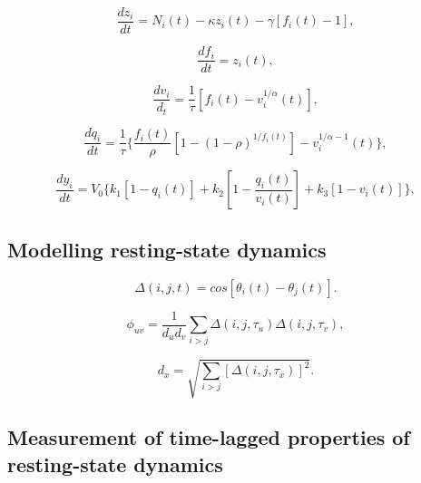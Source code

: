 \documentclass[sn-mathphys-num]{sn-jnl}%
\theoremstyle{thmstyleone}%
\theoremstyle{thmstyletwo}%
\theoremstyle{thmstylethree}%
\begin{document}
\begin{equation}\label{eq:vasodilatory_signal}
	\frac{dz_i}{dt} = N_i (t) - 
	\kappa z_i(t) - 
	\gamma [f_i(t) - 1], 
\end{equation}


\begin{equation}\label{eq:blood_inflow}
	\frac{df_i}{dt} = z_i(t),
\end{equation}


\begin{equation}\label{eq:blood_volume}
	\frac{dv_i}{d_t} = \frac{1}{\tau} [f_i(t) - v_i^{1/\alpha} (t)],
\end{equation}


\begin{equation}\label{eq:deoxyhaemoglobin}
	\frac{dq_i}{dt} = \frac{1}{\tau}
	\{
	\frac{f_i(t)}{\rho}
	[1 - (1-\rho)^{1/f_i(t)}]
	- v_i^{1/\alpha - 1} (t)
	\},
\end{equation}


\begin{equation}\label{eq:BOLD_signal}
	\frac{dy_i}{dt} = V_0
	\{
	k_1 [1 - q_i(t)] +
	k_2 [1 - \frac{q_i(t)}{v_i(t)}] + 
	k_3 [1 - v_i(t)]
	\},
\end{equation}


\subsection{Modelling resting-state dynamics} \label{sec:modelling_resting}


\begin{equation}\label{eq:synchrony}
	\Delta(i,j,t) = cos [\theta_i (t) - \theta_j (t)].
\end{equation}


\begin{equation}\label{eq:synchrony_similarity}
	\phi_{uv} = \frac{1}{d_u d_v} 
	\sum_{i>j} \Delta(i,j,\tau_u) \Delta(i,j,\tau_v),
\end{equation}

\begin{equation}\label{key}
	d_x = \sqrt{\sum_{i>j}
		[
		\Delta(i,j,\tau_x)
		]^2
	}.
\end{equation}


\subsection{Measurement of time-lagged properties of resting-state dynamics} \label{sec:dynamics_measurement}
\end{document}
